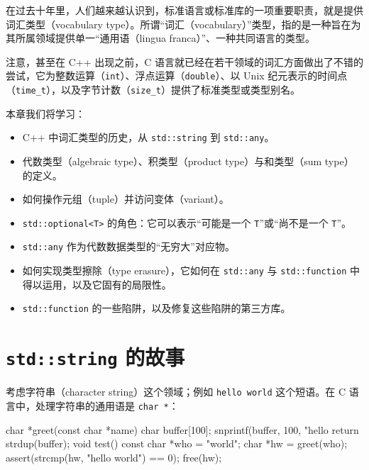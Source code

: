 在过去十年里，人们越来越认识到，标准语言或标准库的一项重要职责，就是提供词汇类型（vocabulary type）。所谓“词汇（vocabulary）”类型，指的是一种旨在为其所属领域提供单一“通用语（lingua franca）”、一种共同语言的类型。

注意，甚至在 C++ 出现之前，C 语言就已经在若干领域的词汇方面做出了不错的尝试，它为整数运算（\texttt{int}）、浮点运算（\texttt{double}）、以 Unix 纪元表示的时间点（\texttt{time\_\allowbreak{}t}），以及字节计数（\texttt{size\_\allowbreak{}t}）提供了标准类型或类型别名。

本章我们将学习：

\begin{itemize}
\item C++ 中词汇类型的历史，从 \texttt{std::\allowbreak{}string} 到 \texttt{std::\allowbreak{}any}。
\item 代数类型（algebraic type）、积类型（product type）与和类型（sum type）的定义。
\item 如何操作元组（tuple）并访问变体（variant）。
\item \texttt{std::\allowbreak{}optional<\allowbreak{}T>\allowbreak{}} 的角色：它可以表示“可能是一个 \texttt{T}”或“尚不是一个 \texttt{T}”。
\item \texttt{std::\allowbreak{}any} 作为代数数据类型的“无穷大”对应物。
\item 如何实现类型擦除（type erasure），它如何在 \texttt{std::\allowbreak{}any} 与 \texttt{std::\allowbreak{}function} 中得以运用，以及它固有的局限性。
\item \texttt{std::\allowbreak{}function} 的一些陷阱，以及修复这些陷阱的第三方库。
\end{itemize}

\section{\texttt{std::\allowbreak{}string} 的故事}

考虑字符串（character string）这个领域；例如 \texttt{hello world} 这个短语。在 C 语言中，处理字符串的通用语是 \texttt{char *}：

\begin{codebox}[cpp]
    char *greet(const char *name) {
      char buffer[100];
      snprintf(buffer, 100, "hello %
      return strdup(buffer);
    }
    void test() {
      const char *who = "world";
      char *hw = greet(who);
      assert(strcmp(hw, "hello world") == 0);
      free(hw);
    }
\end{codebox}

